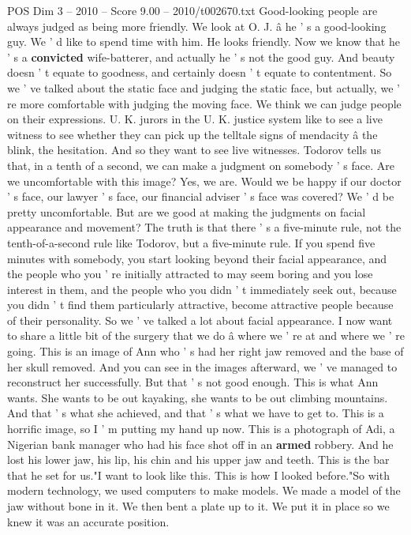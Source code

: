 \begin{textsample}{POS Dim 3 – 2010 – Score 9.00 – 2010/t002670.txt}
Good-looking people are always judged as being more friendly.
We look at O.
J. â he ' s a good-looking guy.
We ' d like to spend time with him.
He looks friendly.
Now we know that he ' s a \textbf{convicted} wife-batterer, and actually he ' s not the good guy.
And beauty doesn ' t equate to goodness, and certainly doesn ' t equate to contentment.
So we ' ve talked about the static face and judging the static face, but actually, we ' re more comfortable with judging the moving face.
We think we can judge people on their expressions.
U.
K. jurors in the U.
K. justice system like to see a live witness to see whether they can pick up the telltale signs of mendacity â the blink, the hesitation.
And so they want to see live witnesses.
Todorov tells us that, in a tenth of a second, we can make a judgment on somebody ' s face.
Are we uncomfortable with this image?
Yes, we are.
Would we be happy if our doctor ' s face, our lawyer ' s face, our financial adviser ' s face was covered?
We ' d be pretty uncomfortable.
But are we good at making the judgments on facial appearance and movement?
The truth is that there ' s a five-minute rule, not the tenth-of-a-second rule like Todorov, but a five-minute rule.
If you spend five minutes with somebody, you start looking beyond their facial appearance, and the people who you ' re initially attracted to may seem boring and you lose interest in them, and the people who you didn ' t immediately seek out, because you didn ' t find them particularly attractive, become attractive people because of their personality.
So we ' ve talked a lot about facial appearance.
I now want to share a little bit of the surgery that we do â where we ' re at and where we ' re going.
This is an image of Ann who ' s had her right jaw removed and the base of her skull removed.
And you can see in the images afterward, we ' ve managed to reconstruct her successfully.
But that ' s not good enough.
This is what Ann wants.
She wants to be out kayaking, she wants to be out climbing mountains.
And that ' s what she achieved, and that ' s what we have to get to.
This is a horrific image, so I ' m putting my hand up now.
This is a photograph of Adi, a Nigerian bank manager who had his face shot off in an \textbf{armed} robbery.
And he lost his lower jaw, his lip, his chin and his upper jaw and teeth.
This is the bar that he set for us."I want to look like this.
This is how I looked before."So with modern technology, we used computers to make models.
We made a model of the jaw without bone in it.
We then bent a plate up to it.
We put it in place so we knew it was an accurate position.

\end{textsample}

